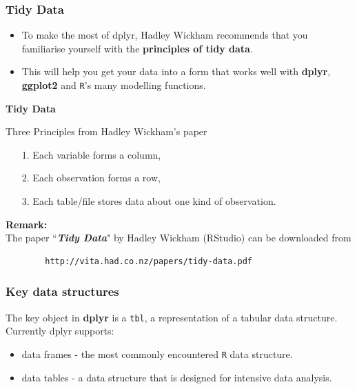 \documentclass{beamer}
\begin{document}
	\begin{frame}
		\frametitle{Tidy Data}
		\Large
		\vspace{-1cm}
		\begin{itemize}
			
			\item To make the most of dplyr, Hadley Wickham recommends that you familiarise yourself with the \textbf{principles of tidy data}. 
			\item This will help you get your data into a form that works well with \textbf{dplyr}, \textbf{ggplot2} and \texttt{R}'s many modelling functions.
		\end{itemize}
	\end{frame}
	
	\begin{frame}[fragile]
		\textbf{Tidy Data}
		\begin{framed}
			\noindent Three Principles from Hadley Wickham's paper
			\begin{itemize}
				\item[1.] Each variable forms a column, 
				\item[2.] Each observation forms a row, 
				\item[3.] Each table/file stores data about one kind of observation.
			\end{itemize}
		\end{framed}
		\noindent \textbf{Remark:} \\  The paper ``\textit{\textbf{Tidy Data}}" by Hadley Wickham (RStudio) can be downloaded from 
		\begin{verbatim}
		http://vita.had.co.nz/papers/tidy-data.pdf
		\end{verbatim}
	\end{frame}
	\begin{frame}
		\frametitle{Key data structures}
		\Large
		\vspace{-0.7cm}
		The key object in \textbf{dplyr} is a \texttt{tbl}, a representation of a tabular data structure. Currently dplyr supports:
		
		\begin{itemize}
			\item data frames - the  most commonly encountered \texttt{R} data structure. 
			\item data tables - a data structure that is designed for intensive data analysis.
		\end{itemize}
		
	\end{frame}
\end{document}
